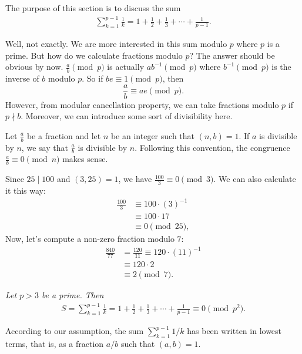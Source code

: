 \documentclass[12pt]{subfile}
\begin{document}
	The purpose of this section is to discuss the sum
		\begin{align*}
			\sum_{k=1}^{p-1} \frac{1}{k} = 1+\frac{1}{2}+ \frac{1}{3}+\cdots+ \frac{1}{p-1}.
		\end{align*}
	
	Well, not exactly. We are more interested in this sum modulo $p$ where $p$ is a prime. But how do we calculate fractions modulo $p$? The answer should be obvious by now. $\frac{a}{b}\pmod p$ is actually $ab^{-1}\pmod p$ where $b^{-1}\pmod p$ is the inverse of $b$ modulo $p$. So if $be\equiv1\pmod p$, then $$\frac{a}{b}\equiv ae\pmod p.$$ However, from modular cancellation property, we can take fractions modulo $p$ if $p\nmid b$. Moreover, we can introduce some sort of divisibility here.
	
	Let $ \frac{a}{b}$ be a fraction and let $n$ be an integer such that $(n,b)=1$. If $a$ is divisible by $n$, we say that $ \frac{a}{b}$ is divisible by $n$. Following this convention, the congruence $\frac{a}{b} \equiv 0 \pmod n$ makes sense.
		\begin{example}
			Since $25 \mid 100$ and $(3,25)=1$, we have $\frac{100}{3} \equiv 0 \pmod 3$. We can also calculate it this way:
				\begin{align*}
					\frac{100}{3}   &\equiv 100 \cdot (3)^{-1} \\
					&\equiv 100 \cdot 17\\
					&\equiv 0 \pmod{25},
				\end{align*}
			Now, let's compute a non-zero fraction modulo $7$:
				\begin{align*}
					\frac{840}{77} &= \frac{120}{11} \equiv 120 \cdot (11)^{-1}\\
					&\equiv 120 \cdot 2 \\
					& \equiv 2 \pmod{7}.
				\end{align*}
		\end{example}
	
	
		\begin{theorem}\slshape\label{thm:wolst}
			Let $p>3$ be a prime. Then
			\begin{align*}
				S = \sum_{k=1}^{p-1} \frac{1}{k} = 1+\frac{1}{2}+ \frac{1}{3}+\cdots+ \frac{1}{p-1} \equiv 0 \pmod{p^2}.
			\end{align*}
		\end{theorem}
		
		\begin{note}
			According to our assumption, the sum $ \sum_{k=1}^{p-1} 1/k$ has been written in lowest terms, that is, as a fraction $a/b$ such that $(a,b)=1$. 
		\end{note}
		
\end{document}
